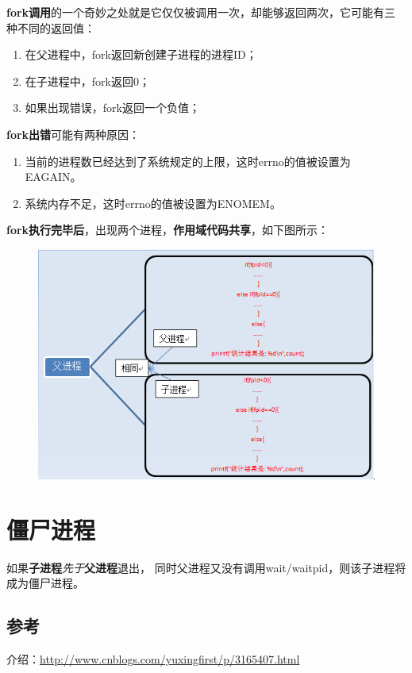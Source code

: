 \documentclass[UTF8,a4paper,12pt]{ctexbook}
\begin{document}
		\textbf{fork调用}的一个奇妙之处就是它仅仅被调用一次，却能够返回两次，它可能有三种不同的返回值： 
		\begin{enumerate}[itemindent = 2em]
			\item 在父进程中，fork返回新创建子进程的进程ID；
			\item 在子进程中，fork返回0；
			\item 如果出现错误，fork返回一个负值；
		\end{enumerate}
		
		\textbf{fork出错}可能有两种原因：
		\begin{enumerate}[itemindent = 2em]
			\item 当前的进程数已经达到了系统规定的上限，这时errno的值被设置为EAGAIN。
			\item 系统内存不足，这时errno的值被设置为ENOMEM。
		\end{enumerate} 
		 
		 \textbf{fork执行完毕后}，出现两个进程，\textbf{作用域代码共享}，如下图所示：
			 \begin{figure}[h]
			 	\centering
			 	\includegraphics[scale = 0.7]{figures/fork.jpg}
			 \end{figure}
	\section{僵尸进程}
		如果\textbf{子进程}\textit{先于}\textbf{父进程}退出， 同时父进程又没有调用wait/waitpid，则该子进程将成为僵尸进程。
		
		\subsection{参考}
			介绍：\url{http://www.cnblogs.com/yuxingfirst/p/3165407.html}
			
\end{document}
